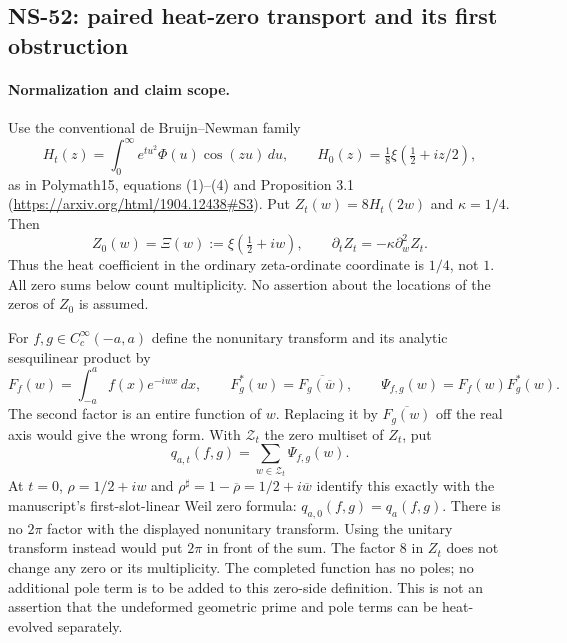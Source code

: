 \subsection*{NS-52: paired heat-zero transport and its first obstruction}

\paragraph{Normalization and claim scope.}
Use the conventional de Bruijn--Newman family
\[
 H_t(z)=\int_0^\infty e^{tu^2}\Phi(u)\cos(zu)\,du,
 \qquad H_0(z)=\tfrac18\xi(\tfrac12+iz/2),
\]
as in Polymath15, equations (1)--(4) and Proposition 3.1
(\url{https://arxiv.org/html/1904.12438#S3}).
Put $Z_t(w)=8H_t(2w)$ and $\kappa=1/4$. Then
\begin{equation}\label{eq:ns52-normalization}
 Z_0(w)=\Xi(w):=\xi(\tfrac12+iw),\qquad
 \partial_t Z_t=-\kappa\partial_w^2 Z_t.
\end{equation}
Thus the heat coefficient in the ordinary zeta-ordinate coordinate is
$1/4$, not $1$. All zero sums below count multiplicity. No assertion
about the locations of the zeros of $Z_0$ is assumed.

For $f,g\in C_c^\infty(-a,a)$ define the nonunitary transform and
its analytic sesquilinear product by
\[
 F_f(w)=\int_{-a}^a f(x)e^{-iwx}\,dx,\qquad
 F_g^*(w)=\overline{F_g(\overline w)},\qquad
 \Psi_{f,g}(w)=F_f(w)F_g^*(w).
\]
The second factor is an entire function of $w$. Replacing it by
$\overline{F_g(w)}$ off the real axis would give the wrong form.
With $\mathcal Z_t$ the zero multiset of $Z_t$, put
\begin{equation}\label{eq:ns52-zero-form}
 q_{a,t}(f,g)=\sum_{w\in\mathcal Z_t}\Psi_{f,g}(w).
\end{equation}
At $t=0$, $\rho=1/2+iw$ and
$\rho^\sharp=1-\overline\rho=1/2+i\overline w$ identify this
exactly with the manuscript's first-slot-linear Weil zero formula:
$q_{a,0}(f,g)=q_a(f,g)$. There is no $2\pi$ factor with the
displayed nonunitary transform. Using the unitary transform instead
would put $2\pi$ in front of the sum. The factor $8$ in $Z_t$ does
not change any zero or its multiplicity. The completed function has
no poles; no additional pole term is to be added to this zero-side
definition. This is not an assertion that the undeformed geometric
prime and pole terms can be heat-evolved separately.

